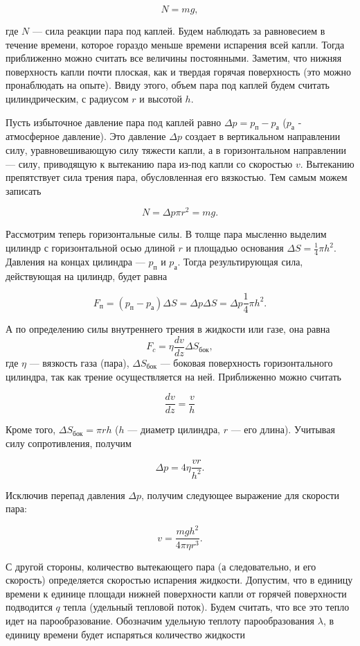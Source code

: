 \documentclass[a4paper,12pt]{article} %
\begin{document}
$$N = mg,$$

\noindent где $N$ — сила реакции пара под каплей. Будем наблюдать за равновесием в течение времени, которое гораздо меньше времени испарения всей капли. Тогда приближенно можно считать все величины постоянными. Заметим, что нижняя поверхность капли почти плоская, как и твердая горячая поверхность (это можно пронаблюдать на опыте). Ввиду этого, объем пара под каплей будем считать цилиндрическим, с радиусом $r$ и высотой $h$. 

\medskip

\noindent Пусть избыточное давление пара под каплей равно $\Delta p = p_{\text{п}} - p_{\text{а}}$ ($p_{\text{а}}$ - атмосферное давление). Это давление $\Delta p$ создает в вертикальном направлении силу, уравновешивающую силу тяжести капли, а в горизонтальном направлении — силу, приводящую к вытеканию пара из-под капли со скоростью $v$. Вытеканию препятствует сила трения пара, обусловленная его вязкостью. Тем самым можем записать 

$$ N = \Delta p \pi r^{2} = mg. $$

\noindent Рассмотрим теперь горизонтальные силы. В толще пара мысленно выделим цилиндр с горизонтальной осью длиной $r$ и площадью основания $\Delta S = \frac{1}{4} \pi h^{2}$. Давления на концах цилиндра — $p_{\text{п}}$ и $p_{\text{а}}$. Тогда результирующая сила, действующая на цилиндр, будет равна

$$F_{\text{п}} = (p_{\text{п}} - p_{\text{а}}) \Delta S = \Delta p \Delta S = \Delta p \frac{1}{4} \pi h^{2} .$$

\noindent А по определению силы внутреннего трения в жидкости или газе, она равна
$$F_c = \eta \frac{dv}{dz} \Delta S_\text{бок}, $$
\noindent где $\eta$ — вязкость газа (пара), $\Delta S_{\text{бок}}$ — боковая поверхность горизонтального цилиндра, так как трение осуществляется на ней. Приближенно можно считать

$$\frac{dv}{dz} = \frac{v}{h}$$

\noindent Кроме того, $\Delta S_{\text{бок}} = \pi r h$ ($h$ — диаметр цилиндра, $r$ — его длина). Учитывая силу сопротивления, получим

$$\Delta p = 4 \eta \frac{vr}{{h}^2}. $$

\noindent Исключив перепад давления $\Delta p$, получим следующее выражение для скорости пара:

$$v = \frac{mgh^2}{4 \pi \eta r^3} .$$

\noindent С другой стороны, количество вытекающего пара (а следовательно, и его скорость) определяется скоростью испарения жидкости. Допустим, что в единицу времени к единице площади нижней поверхности капли от горячей поверхности подводится $q$ тепла (удельный тепловой поток). Будем считать, что все это тепло идет на парообразование. Обозначим удельную теплоту парообразования $\lambda$, в единицу времени будет испаряться количество жидкости
\end{document}
